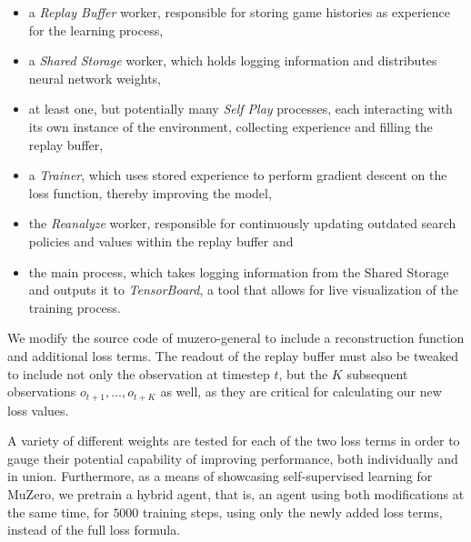\begin{itemize}
    \item a \textit{Replay Buffer} worker, responsible for storing game histories as experience for the learning process,
    \item a \textit{Shared Storage} worker, which holds logging information and distributes neural network weights,
    \item at least one, but potentially many \textit{Self Play} processes, each interacting with its own instance of the environment, collecting experience and filling the replay buffer,
    \item a \textit{Trainer}, which uses stored experience to perform gradient descent on the loss function, thereby improving the model,
    \item the \textit{Reanalyze} worker, responsible for continuously updating outdated search policies and values within the replay buffer and
    \item the main process, which takes logging information from the Shared Storage and outputs it to \textit{TensorBoard}, a tool that allows for live visualization of the training process.
\end{itemize}

We modify the source code of muzero-general to include a reconstruction function and additional loss terms. The readout of the replay buffer must also be tweaked to include not only the observation at timestep $t$, but the $K$ subsequent observations $o_{t+1}, ..., o_{t+K}$ as well, as they are critical for calculating our new loss values.

A variety of different weights are tested for each of the two loss terms in order to gauge their potential capability of improving performance, both individually and in union. Furthermore, as a means of showcasing self-supervised learning for MuZero, we pretrain a hybrid agent, that is, an agent using both modifications at the same time, for $5000$ training steps, using only the newly added loss terms, instead of the full loss formula.


